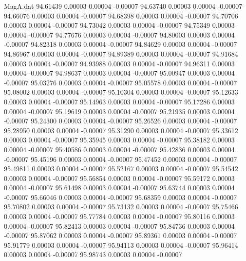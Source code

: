 \begin{filecontents}{MagA.dat}
  94.61439    0.00003    0.00004   -0.00007
  94.63740    0.00003    0.00004   -0.00007
  94.66076    0.00003    0.00004   -0.00007
  94.68398    0.00003    0.00004   -0.00007
  94.70706    0.00003    0.00004   -0.00007
  94.73042    0.00003    0.00004   -0.00007
  94.75349    0.00003    0.00004   -0.00007
  94.77676    0.00003    0.00004   -0.00007
  94.80003    0.00003    0.00004   -0.00007
  94.82318    0.00003    0.00004   -0.00007
  94.84629    0.00003    0.00004   -0.00007
  94.86967    0.00003    0.00004   -0.00007
  94.89389    0.00003    0.00004   -0.00007
  94.91684    0.00003    0.00004   -0.00007
  94.93988    0.00003    0.00004   -0.00007
  94.96311    0.00003    0.00004   -0.00007
  94.98637    0.00003    0.00004   -0.00007
  95.00947    0.00003    0.00004   -0.00007
  95.03276    0.00003    0.00004   -0.00007
  95.05578    0.00003    0.00004   -0.00007
  95.08002    0.00003    0.00004   -0.00007
  95.10304    0.00003    0.00004   -0.00007
  95.12633    0.00003    0.00004   -0.00007
  95.14963    0.00003    0.00004   -0.00007
  95.17286    0.00003    0.00004   -0.00007
  95.19619    0.00003    0.00004   -0.00007
  95.21935    0.00003    0.00004   -0.00007
  95.24300    0.00003    0.00004   -0.00007
  95.26526    0.00003    0.00004   -0.00007
  95.28950    0.00003    0.00004   -0.00007
  95.31290    0.00003    0.00004   -0.00007
  95.33612    0.00003    0.00004   -0.00007
  95.35945    0.00003    0.00004   -0.00007
  95.38182    0.00003    0.00004   -0.00007
  95.40586    0.00003    0.00004   -0.00007
  95.42836    0.00003    0.00004   -0.00007
  95.45196    0.00003    0.00004   -0.00007
  95.47452    0.00003    0.00004   -0.00007
  95.49811    0.00003    0.00004   -0.00007
  95.52167    0.00003    0.00004   -0.00007
  95.54542    0.00003    0.00004   -0.00007
  95.56854    0.00003    0.00004   -0.00007
  95.59172    0.00003    0.00004   -0.00007
  95.61498    0.00003    0.00004   -0.00007
  95.63744    0.00003    0.00004   -0.00007
  95.66046    0.00003    0.00004   -0.00007
  95.68359    0.00003    0.00004   -0.00007
  95.70802    0.00003    0.00004   -0.00007
  95.73132    0.00003    0.00004   -0.00007
  95.75466    0.00003    0.00004   -0.00007
  95.77784    0.00003    0.00004   -0.00007
  95.80116    0.00003    0.00004   -0.00007
  95.82413    0.00003    0.00004   -0.00007
  95.84736    0.00003    0.00004   -0.00007
  95.87062    0.00003    0.00004   -0.00007
  95.89361    0.00003    0.00004   -0.00007
  95.91779    0.00003    0.00004   -0.00007
  95.94113    0.00003    0.00004   -0.00007
  95.96414    0.00003    0.00004   -0.00007
  95.98743    0.00003    0.00004   -0.00007

\end{filecontents}
